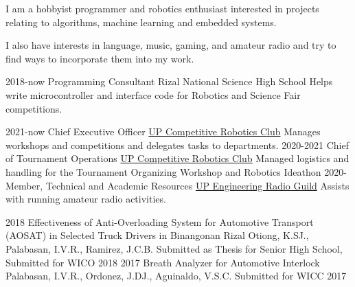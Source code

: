 \documentclass[9pt]{developercv}
\begin{document}
\begin{minipage}[t]{0.475\textwidth} 
	\vspace{-\baselineskip}

	I am a hobbyist programmer and robotics enthusiast interested in projects relating to algorithms, machine learning and embedded systems.

	I also have interests in language, music, gaming, and amateur radio and try to find ways to incorporate them into my work.


	\begin{entrylist}
		\entry
			{2018-now}
			{Programming Consultant}
			{Rizal National Science High School}
			{Helps write microcontroller and interface code for Robotics and Science Fair competitions. }
	\end{entrylist}
	\cvsect{Organizations}
	\begin{entrylist}
		\entry
			{2021-now}
			{Chief Executive Officer}
			{\href{https://upcrc.org}{UP Competitive Robotics Club}}
			{Manages workshops and competitions and delegates tasks to departments.}
		\entry
			{2020-2021}
			{Chief of Tournament Operations}
			{\href{https://upcrc.org}{UP Competitive Robotics Club}}
			{Managed logistics and handling for the Tournament Organizing Workshop and Robotics Ideathon}
		\entry
			{2020-}
			{Member, Technical and Academic Resources}
			{\href{https://up-erg.org}{UP Engineering Radio Guild}}
			{Assists with running amateur radio activities.}
	\end{entrylist}
	\cvsect{Publications}
	\begin{entrylist}
		\entry
			{2018}
			{Effectiveness of Anti-Overloading System for Automotive Transport (AOSAT) in Selected Truck Drivers in Binangonan Rizal}
			{Otiong, K.SJ., Palabasan, I.V.R., Ramirez, J.C.B.}
			{Submitted as Thesis for Senior High School, Submitted for WICO 2018}
		\entry
			{2017}
			{Breath Analyzer for Automotive Interlock}
			{Palabasan, I.V.R., Ordonez, J.DJ., Aguinaldo, V.S.C.}
			{Submitted for WICC 2017}
	\end{entrylist}

\end{minipage}
\hfill 
\end{document}
